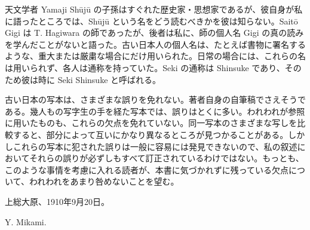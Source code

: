\documentclass[11pt]{article}
\newcommand{\scanfooter}{}
\begin{document}
天文学者 Yamaji Shūjū の子孫はすぐれた歴史家・思想家であるが、彼自身が私に語ったところでは、Shūjū という名をどう読むべきかを彼は知らない。Saitō Gigi は T. Hagiwara の師であったが、後者は私に、師の個人名 Gigi の真の読みを学んだことがないと語った。古い日本人の個人名は、たとえば書物に署名するような、重大または厳粛な場合にだけ用いられた。日常の場合には、これらの名は用いられず、各人は通称を持っていた。Seki の通称は Shinsuke であり、そのため彼は時に Seki Shinsuke と呼ばれる。

古い日本の写本は、さまざまな誤りを免れない。著者自身の自筆稿でさえそうである。幾人もの写字生の手を経た写本では、誤りはとくに多い。われわれが参照に用いたものも、これらの欠点を免れていない。同一写本のさまざまな写しを比較すると、部分によって互いにかなり異なるところが見つかることがある。しかしこれらの写本に犯された誤りは一般に容易には発見できないので、私の叙述においてそれらの誤りが必ずしもすべて訂正されているわけではない。もっとも、このような事情を考慮に入れる読者が、本書に気づかれずに残っている欠点について、われわれをあまり咎めないことを望む。

\begin{flushleft}上総大原、1910年9月20日。\end{flushleft}
\begin{flushright}Y. Mikami.\end{flushright}
\scanfooter
\end{document}
